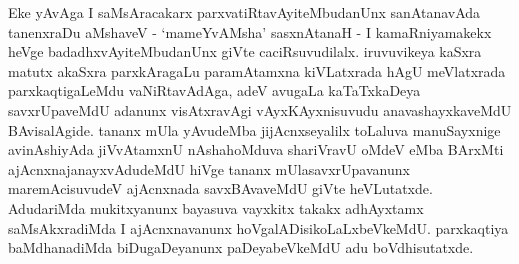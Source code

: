 Eke yAvAga I saMsAracakarx parxvatiRtavAyiteMbudanUnx sanAtanavAda tanenxraDu aMshaveV - `mameYvAMsha' sasxnAtanaH - I kamaRniyamakekx heVge badadhxvAyiteMbudanUnx giVte caciRsuvudilalx. iruvuvikeya kaSxra matutx akaSxra parxkAragaLu paramAtamxna kiVLatxrada hAgU meVlatxrada parxkaqtigaLeMdu vaNiRtavAdAga, adeV avugaLa kaTaTxkaDeya savxrUpaveMdU adanunx visAtxravAgi vAyxKAyxnisuvudu anavashayxkaveMdU BAvisalAgide. tananx mUla yAvudeMba jijAcnxseyalilx toLaluva manuSayxnige avinAshiyAda jiVvAtamxnU nAshahoMduva shariVravU oMdeV eMba BArxMti ajAcnxnajanayxvAdudeMdU hiVge tananx mUlasavxrUpavanunx maremAcisuvudeV ajAcnxnada savxBAvaveMdU giVte heVLutatxde. AdudariMda mukitxyanunx bayasuva vayxkitx takakx adhAyxtamx saMsAkxradiMda I ajAcnxnavanunx hoVgalADisikoLaLxbeVkeMdU. parxkaqtiya baMdhanadiMda biDugaDeyanunx paDeyabeVkeMdU adu boVdhisutatxde.

